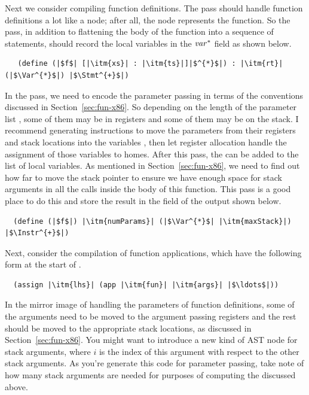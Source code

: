 \documentclass[11pt]{book}
\begin{document}
Next we consider compiling function definitions.  The 
pass should handle function definitions a lot like a 
node; after all, the  node represents the 
function. So the  pass, in addition to flattening the
body of the function into a sequence of statements, should record the
local variables in the $\mathit{var}^{*}$ field as shown below.
\begin{lstlisting}
   (define (|$f$| [|\itm{xs}| : |\itm{ts}|]|$^{*}$|) : |\itm{rt}| (|$\Var^{*}$|) |$\Stmt^{+}$|)
\end{lstlisting}
In the  pass, we need to encode the
parameter passing in terms of the conventions discussed in
Section~\ref{sec:fun-x86}. So depending on the length of the parameter
list , some of them may be in registers and some of them may
be on the stack. I recommend generating  instructions to
move the parameters from their registers and stack locations into the
variables , then let register allocation handle the assignment
of those variables to homes. After this pass, the  can be
added to the list of local variables. As mentioned in
Section~\ref{sec:fun-x86}, we need to find out how far to move the
stack pointer to ensure we have enough space for stack arguments in
all the calls inside the body of this function. This pass is a good
place to do this and store the result in the  field of
the output  shown below.
\begin{lstlisting}
  (define (|$f$|) |\itm{numParams}| (|$\Var^{*}$| |\itm{maxStack}|) |$\Instr^{+}$|)
\end{lstlisting}

Next, consider the compilation of function applications, which have
the following form at the start of .
\begin{lstlisting}
  (assign |\itm{lhs}| (app |\itm{fun}| |\itm{args}| |$\ldots$|))
\end{lstlisting}
In the mirror image of handling the parameters of function
definitions, some of the arguments  need to be moved to the
argument passing registers and the rest should be moved to the
appropriate stack locations, as discussed in
Section~\ref{sec:fun-x86}. You might want to introduce a new kind of
AST node for stack arguments,  where $i$ is the
index of this argument with respect to the other stack arguments. As
you're generate this code for parameter passing, take note of how many
stack arguments are needed for purposes of computing the
 discussed above.
\end{document}

